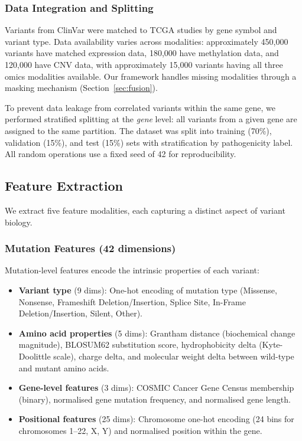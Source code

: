 \documentclass[journal,twoside]{IEEEtran}
\begin{document}
\subsubsection{Data Integration and Splitting}
Variants from ClinVar were matched to TCGA studies by gene symbol and variant
type. Data availability varies across modalities: approximately 450,000
variants have matched expression data, 180,000 have methylation data, and
120,000 have CNV data, with approximately 15,000 variants having all three
omics modalities available. Our framework handles missing modalities through
a masking mechanism (Section~\ref{sec:fusion}).

To prevent data leakage from correlated variants within the same gene, we
performed stratified splitting at the \emph{gene} level: all variants from
a given gene are assigned to the same partition. The dataset was split into
training (70\%), validation (15\%), and test (15\%) sets with stratification
by pathogenicity label. All random operations use a fixed seed of 42 for
reproducibility.

\subsection{Feature Extraction}
\label{sec:features}

We extract five feature modalities, each capturing a distinct aspect of
variant biology.

\subsubsection{Mutation Features (42 dimensions)}
Mutation-level features encode the intrinsic properties of each variant:
\begin{itemize}
    \item \textbf{Variant type} (9 dims): One-hot encoding of mutation type
    (Missense, Nonsense, Frameshift Deletion/Insertion, Splice Site,
    In-Frame Deletion/Insertion, Silent, Other).
    \item \textbf{Amino acid properties} (5 dims): Grantham distance
    (biochemical change magnitude), BLOSUM62 substitution score, hydrophobicity
    delta (Kyte-Doolittle scale), charge delta, and molecular weight delta
    between wild-type and mutant amino acids.
    \item \textbf{Gene-level features} (3 dims): COSMIC Cancer Gene Census
    membership (binary), normalised gene mutation frequency, and normalised
    gene length.
    \item \textbf{Positional features} (25 dims): Chromosome one-hot encoding
    (24 bins for chromosomes 1--22, X, Y) and normalised position within the
    gene.
\end{itemize}
\end{document}
